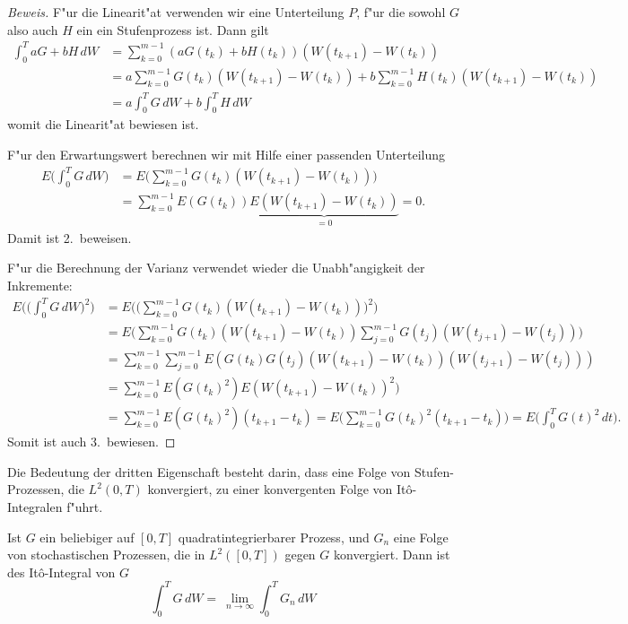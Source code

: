\begin{proof}[Beweis]
F"ur die Linearit"at verwenden wir eine Unterteilung $P$, f"ur die sowohl
$G$ also auch $H$ ein ein Stufenprozess ist.
Dann gilt
\begin{align*}
\int_0^T aG+bH\,dW
&=
\sum_{k=0}^{m-1} (aG(t_k)+bH(t_k))(W(t_{k+1})-W(t_k))
\\
&=
a\sum_{k=0}^{m-1} G(t_k)(W(t_{k+1})-W(t_k))
+
b\sum_{k=0}^{m-1} H(t_k)(W(t_{k+1})-W(t_k))
\\
&=a\int_0^TG\,dW+b\int_0^TH\,dW
\end{align*}
womit die Linearit"at bewiesen ist.

F"ur den Erwartungswert berechnen wir mit Hilfe einer passenden Unterteilung
\begin{align*}
E\biggl(\int_0^T G\,dW\biggr)
&=
E\biggl(\sum_{k=0}^{m-1} G(t_k) (W(t_{k+1}) - W(t_k))\biggr)
\\
&=
\sum_{k=0}^{m-1} E(G(t_k)) \underbrace{E(W(t_{k+1}) - W(t_k))}_{\textstyle =0}=0.
\end{align*}
Damit ist 2.~beweisen.

F"ur die Berechnung der Varianz verwendet wieder die Unabh"angigkeit der
Inkremente:
\begin{align*}
E\biggl(\biggl(\int_0^T G\,dW\biggr)^2\biggr)
&=
E\biggl(\biggl(\sum_{k=0}^{m-1}G(t_k)(W(t_{k+1})-W(t_k))\biggr)^2\biggr)
\\
&=
E\biggl(
\sum_{k=0}^{m-1}G(t_k)(W(t_{k+1})-W(t_k))
\sum_{j=0}^{m-1}G(t_j)(W(t_{j+1})-W(t_j))
\biggr)
\\
&=
\sum_{k=0}^{m-1}
\sum_{j=0}^{m-1}
E(G(t_k) G(t_j)
(W(t_{k+1})-W(t_k))
(W(t_{j+1})-W(t_j))
)
\\
&=
\sum_{k=0}^{m-1}
E(G(t_k)^2) E(W(t_{k+1})-W(t_k))^2)
\\
&=
\sum_{k=0}^{m-1}
E(G(t_k)^2) (t_{k+1}-t_k)
=
E\biggl(
\sum_{k=0}^{m-1}
G(t_k)^2 (t_{k+1}-t_k)
\biggr)
=E\biggl(\int_0^T G(t)^2\,dt\biggr).
\end{align*}
Somit ist auch 3.~bewiesen.
\end{proof}

Die Bedeutung der dritten Eigenschaft besteht darin, dass eine
Folge von Stufen-Prozessen, die $L^2(0,T)$ konvergiert, zu einer
konvergenten Folge von It\^o-Integralen f"uhrt.

\begin{definition}
Ist $G$ ein beliebiger auf $[0,T]$ quadratintegrierbarer Prozess,
und $G_n$ eine Folge von stochastischen Prozessen, die in $L^2([0,T])$
gegen $G$ konvergiert.
Dann ist des It\^o-Integral von $G$
\[
\int_0^T G\,dW
=
\
\lim_{n\to\infty} \int_0^T G_n\,dW
\]
\end{definition}

